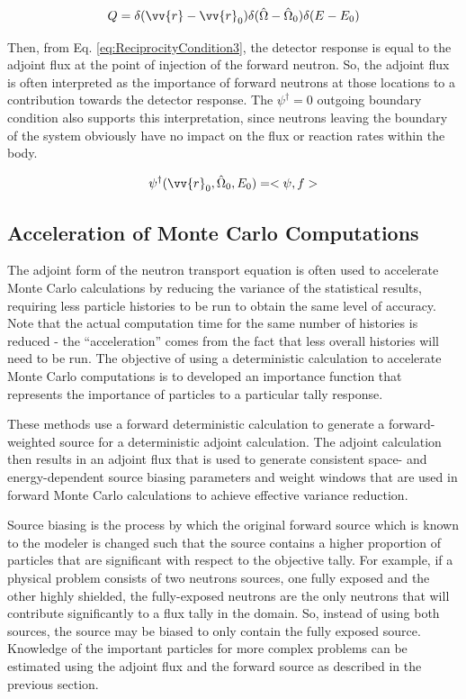 \documentclass[10pt]{article}
\newcommand{\hO}{\hat{\Omega}}
\begin{document}
\begin{flushleft}
\begin{equation}
Q=\delta(\vv{r}-\vv{r}_0)\delta(\hO  -\hO  _0)\delta(E-E_0)
\end{equation}

Then, from Eq. \eqref{eq:ReciprocityCondition3}, the detector response is equal to the adjoint flux at the point of injection of the forward neutron. So, the adjoint flux is often interpreted as the importance of forward neutrons at those locations to a contribution towards the detector response. The \(\psi^\dagger=0\) outgoing boundary condition also supports this interpretation, since neutrons leaving the boundary of the system obviously have no impact on the flux or reaction rates within the body. 

\begin{equation}
\label{eq:ReciprocityCondition3}
\psi^\dagger(\vv{r}_0,\hO  _0,E_0)=<\psi,f>
\end{equation}

\subsection{Acceleration of Monte Carlo Computations}

The adjoint form of the neutron transport equation is often used to accelerate Monte Carlo calculations by reducing the variance of the statistical results, requiring less particle histories to be run to obtain the same level of accuracy. Note that the actual computation time for the same number of histories is reduced - the ``acceleration'' comes from the fact that less overall histories will need to be run. The objective of using a deterministic calculation to accelerate Monte Carlo computations is to developed an importance function that represents the importance of particles to a particular tally response. 

These methods use a forward deterministic calculation to generate a forward-weighted source for a deterministic adjoint calculation. The adjoint calculation then results in an adjoint flux that is used to generate consistent space- and energy-dependent source biasing parameters and weight windows that are used in forward Monte Carlo calculations to achieve effective variance reduction. 

Source biasing is the process by which the original forward source which is known to the modeler is changed such that the source contains a higher proportion of particles that are significant with respect to the objective tally. For example, if a physical problem consists of two neutrons sources, one fully exposed and the other highly shielded, the fully-exposed neutrons are the only neutrons that will contribute significantly to a flux tally in the domain. So, instead of using both sources, the source may be biased to only contain the fully exposed source. Knowledge of the important particles for more complex problems can be estimated using the adjoint flux and the forward source as described in the previous section. 


\end{flushleft}
\end{document}
